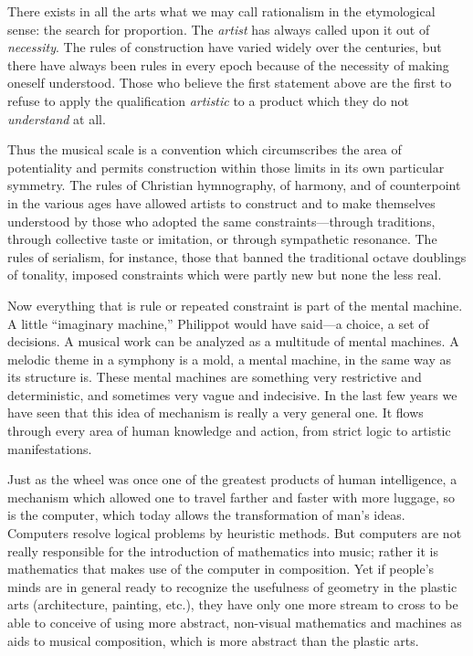 \documentclass[letterpaper, 11pt]{article}
\begin{document}
There exists in all the arts what we may call rationalism in the etymological sense: the search for proportion.
The \textit{artist} has always called upon it out of \textit{necessity}.
The rules of construction have varied widely over the centuries, but there have always been rules in every epoch because of the necessity of making oneself understood.
Those who believe the first statement above are the first to refuse to apply the qualification \textit{artistic} to a product which they do not \textit{understand} at all.

Thus the musical scale is a convention which circumscribes the area of potentiality and permits construction within those limits in its own particular symmetry.
The rules of Christian hymnography, of harmony, and of counterpoint in the various ages have allowed artists to construct and to make themselves understood by those who adopted the same constraints---through traditions, through collective taste or imitation, or through sympathetic resonance.
The rules of serialism, for instance, those that banned the traditional octave doublings of tonality, imposed constraints which were partly new but none the less real.

Now everything that is rule or repeated constraint is part of the mental machine.
A little ``imaginary machine,'' Philippot would have said---a choice, a set of decisions.
A musical work can be analyzed as a multitude of mental machines.
A melodic theme in a symphony is a mold, a mental machine, in the same way as its structure is.
These mental machines are something very restrictive and deterministic, and sometimes very vague and indecisive.
In the last few years we have seen that this idea of mechanism is really a very general one.
It flows through every area of human knowledge and action, from strict logic to artistic manifestations.

Just as the wheel was once one of the greatest products of human intelligence, a mechanism which allowed one to travel farther and faster with more luggage, so is the computer, which today allows the transformation of man's ideas.
Computers resolve logical problems by heuristic methods.
But computers are not really responsible for the introduction of mathematics into music; rather it is mathematics that makes use of the computer in composition.
Yet if people's minds are in general ready to recognize the usefulness of geometry in the plastic arts (architecture, painting, etc.), they have only one more stream to cross to be able to conceive of using more abstract, non-visual mathematics and machines as aids to musical composition, which is more abstract than the plastic arts.
\end{document}
